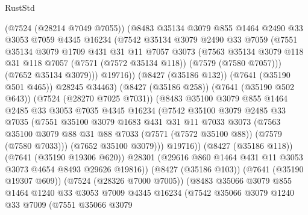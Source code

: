 \begin{lexlean}{RustStd}
\begin{coremodule}
              (@7524 (@28214 @7049 @7055))
              (@8483
                @35134
                @3079
                @855
                @1464
                @2490
                @33
                @3053
                @7059
                @4345
                @16234
                (@7542
                  @35134
                  @3079
                  @2490
                  @33
                  @7059
                  (@7551
                    @35134
                    @3079
                    @1709
                    @431
                    @31
                    @11
                    @7057
                    @3073
                    (@7563
                      @35134
                      @3079
                      @118
                      @31
                      @118
                      @7057
                      (@7571 (@7572 @35134 @118))
                      (@7579 (@7580 @7057)))
                    (@7652 @35134 @3079)))
                @19716))
            (@8427 (@35186 @132))
            (@7641 (@35190 @501 @465))
            @28245
            @34463)
          (@8427 (@35186 @258))
          (@7641 (@35190 @502 @643))
          (@7524 (@28270 @7025 @7031))
          (@8483
            @35100
            @3079
            @855
            @1464
            @2485
            @33
            @3053
            @7035
            @4345
            @16234
            (@7542
              @35100
              @3079
              @2485
              @33
              @7035
              (@7551
                @35100
                @3079
                @1683
                @431
                @31
                @11
                @7033
                @3073
                (@7563
                  @35100
                  @3079
                  @88
                  @31
                  @88
                  @7033
                  (@7571 (@7572 @35100 @88))
                  (@7579 (@7580 @7033)))
                (@7652 @35100 @3079)))
            @19716))
        (@8427 (@35186 @118))
        (@7641 (@35190 @19306 @620))
        @28301
        (@29616 @860 @1464 @431 @11 @3053 @3073 @4654 @8493 @29626 @19816))
      (@8427 (@35186 @103))
      (@7641 (@35190 @19307 @609))
      (@7524 (@28326 @7000 @7005))
      (@8483
        @35066
        @3079
        @855
        @1464
        @1240
        @33
        @3053
        @7009
        @4345
        @16234
        (@7542
          @35066
          @3079
          @1240
          @33
          @7009
          (@7551
            @35066
            @3079

\end{coremodule}
\end{lexlean}
